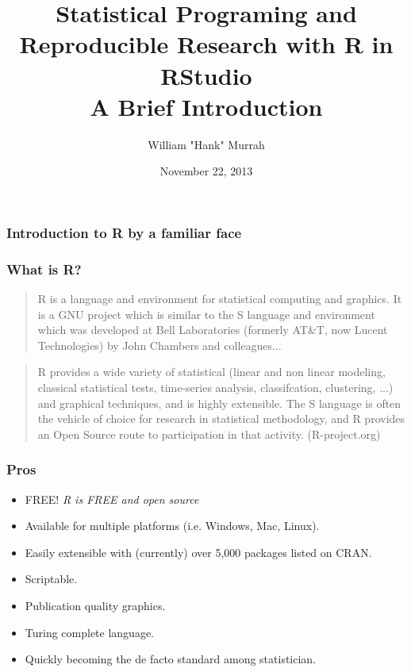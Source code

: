\documentclass{beamer}\usepackage[]{graphicx}\usepackage[]{color}
\title [SP4R: Intro] {Statistical Programing and Reproducible Research with \textbf{R} in \textbf{RStudio} \\ {A Brief Introduction}
}
\author{William "Hank" Murrah}
\date{November 22, 2013}
\begin{document}
\maketitle
% 

\begin{frame}
\frametitle{Introduction to R by a familiar face}





\end{frame}

\begin{frame}
  \frametitle{What is R?}
  \begin{quote}R is a language and environment for statistical computing and graphics. It is a GNU project which is similar to the S language and environment which was developed at Bell Laboratories (formerly AT\&T, now Lucent Technologies) by John Chambers and colleagues...
	\end{quote}
	\pause
	\begin{quote}
	R provides a wide variety of statistical (linear and non linear modeling, classical statistical tests, time-series analysis, classifcation, clustering, ...) and graphical techniques, and is highly extensible. The S language is often the vehicle of choice for research in statistical methodology, and R provides an Open Source route to participation in that activity.
	(R-project.org)
	\end{quote}
\end{frame}
  
\begin{frame}[fragile]
	\frametitle{Pros}
	\begin{itemize}
	\item<+-| alert@+> FREE!
	\textit{	R is FREE and open source}
	\item<+-| alert@+> Available for multiple platforms (i.e. Windows, Mac, Linux).
	\item<+-| alert@+> Easily extensible with (currently) over 5,000 packages listed on CRAN.
	\item<+-| alert@+> Scriptable.
	\item<+-| alert@+> Publication quality graphics.
	\item<+-| alert@+> Turing complete language.
	\item<+-| alert@+> Quickly becoming the de facto standard among statistician.
	\end{itemize}
\end{frame}
\end{document}
